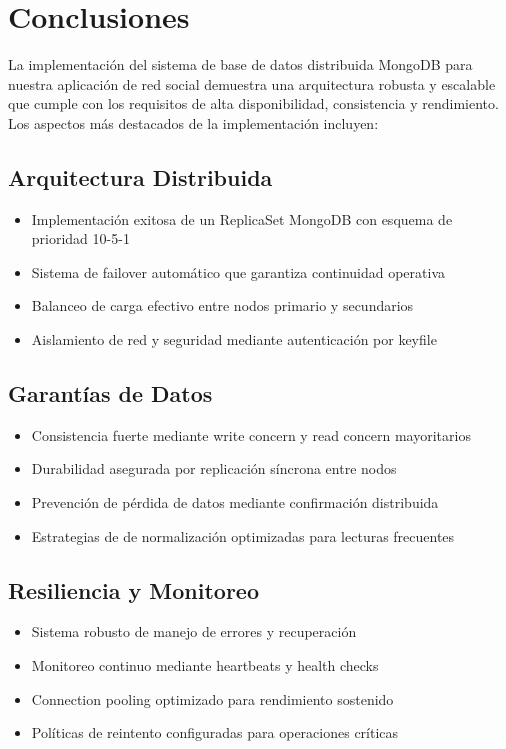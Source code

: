 \documentclass[12pt,letterpaper]{article}
\begin{document}
\section{Conclusiones}
La implementación del sistema de base de datos distribuida MongoDB para nuestra aplicación de red social demuestra una arquitectura robusta y escalable que cumple con los requisitos de alta disponibilidad, consistencia y rendimiento. Los aspectos más destacados de la implementación incluyen:

\subsection{Arquitectura Distribuida}
\begin{itemize}
    \item Implementación exitosa de un ReplicaSet MongoDB con esquema de prioridad 10-5-1
    \item Sistema de failover automático que garantiza continuidad operativa
    \item Balanceo de carga efectivo entre nodos primario y secundarios
    \item Aislamiento de red y seguridad mediante autenticación por keyfile
\end{itemize}

\subsection{Garantías de Datos}
\begin{itemize}
    \item Consistencia fuerte mediante write concern y read concern mayoritarios
    \item Durabilidad asegurada por replicación síncrona entre nodos
    \item Prevención de pérdida de datos mediante confirmación distribuida
    \item Estrategias de de normalización optimizadas para lecturas frecuentes
\end{itemize}

\subsection{Resiliencia y Monitoreo}
\begin{itemize}
    \item Sistema robusto de manejo de errores y recuperación
    \item Monitoreo continuo mediante heartbeats y health checks
    \item Connection pooling optimizado para rendimiento sostenido
    \item Políticas de reintento configuradas para operaciones críticas
\end{itemize}
\end{document}
